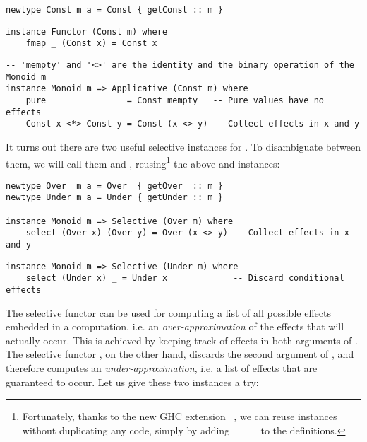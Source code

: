 {\vspace{1mm}
\begin{verbatim}
newtype Const m a = Const { getConst :: m }
\end{verbatim}
\vspace{1mm}
\begin{verbatim}
instance Functor (Const m) where
    fmap _ (Const x) = Const x
\end{verbatim}
\vspace{1mm}
\begin{verbatim}
-- 'mempty' and '<>' are the identity and the binary operation of the Monoid m
instance Monoid m => Applicative (Const m) where
    pure _              = Const mempty   -- Pure values have no effects
    Const x <*> Const y = Const (x <> y) -- Collect effects in x and y
\end{verbatim}
\vspace{1mm}

\noindent
It turns out there are two useful selective instances for . To
disambiguate between them, we will call them  and ,
reusing\footnote{Fortunately, thanks to the new GHC extension
~\citep{blondal2018deriving}, we can reuse 
instances without duplicating any code, simply by adding
~~~~~ to
the  definitions.}
the above  and  instances:

\vspace{1mm}
\begin{verbatim}
newtype Over  m a = Over  { getOver  :: m }
newtype Under m a = Under { getUnder :: m }

instance Monoid m => Selective (Over m) where
    select (Over x) (Over y) = Over (x <> y) -- Collect effects in x and y
\end{verbatim}
\vspace{1mm}
\begin{verbatim}
instance Monoid m => Selective (Under m) where
    select (Under x) _ = Under x             -- Discard conditional effects
\end{verbatim}
\vspace{1mm}

\noindent
The selective functor  can be used for computing a list of all possible
effects embedded in a computation, i.e. an \emph{over-approximation} of the
effects that will actually occur. This is achieved by keeping track of effects
in both arguments of . The selective functor , on the other
hand, discards the second argument of , and therefore computes an
\emph{under-approximation}, i.e. a list of effects that are guaranteed to occur.
Let us give these two instances a try:

}
